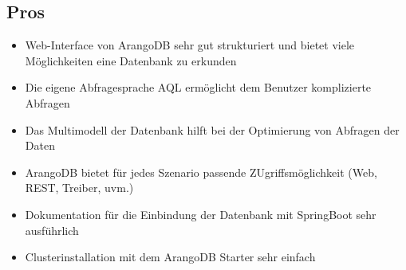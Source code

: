 \subsection{Pros}
\begin{itemize}
\item Web-Interface von ArangoDB sehr gut strukturiert und bietet viele Möglichkeiten eine Datenbank zu erkunden
\item Die eigene Abfragesprache \ac{AQL} ermöglicht dem Benutzer komplizierte Abfragen
\item Das Multimodell der Datenbank hilft bei der Optimierung von Abfragen der Daten
\item ArangoDB bietet für jedes Szenario passende ZUgriffsmöglichkeit (Web, REST, Treiber, uvm.)
\item Dokumentation für die Einbindung der Datenbank mit SpringBoot sehr ausführlich
\item Clusterinstallation mit dem ArangoDB Starter sehr einfach
\end{itemize}